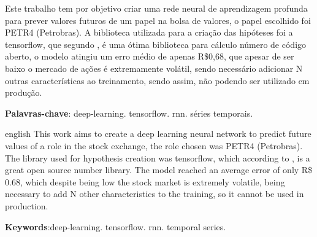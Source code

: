 \documentclass[
	article,			%
	11pt,				%
	oneside,			%
	a4paper,			%
	english,			%
	brazil,				%
	sumario=tradicional
	]{abntex2}
\begin{document}

\frenchspacing 


%
%

\maketitle





\begin{resumoumacoluna}
 Este trabalho tem por objetivo criar uma rede neural de aprendizagem profunda para prever valores futuros de um papel na bolsa de valores, o papel escolhido foi PETR4 (Petrobras). A biblioteca utilizada para a criação das hipóteses foi a tensorflow, que segundo , é uma ótima biblioteca para cálculo número de código aberto, o modelo atingiu um erro médio de apenas R\$0,68, que apesar de ser baixo o mercado de ações é extremamente volátil, sendo necessário adicionar N outras características ao treinamento, sendo assim, não podendo ser utilizado em produção.
 \vspace{\onelineskip}
 
 \noindent
 \textbf{Palavras-chave}: deep-learning. tensorflow. rnn. séries temporais.
\end{resumoumacoluna}


\renewcommand{\resumoname}{Abstract}
\begin{resumoumacoluna}
 \begin{otherlanguage*}{english}
This work aims to create a deep learning neural network to predict future values of a role in the stock exchange, the role chosen was PETR4 (Petrobras). The library used for hypothesis creation was tensorflow, which according to , is a great open source number library. The model reached an average error of only R\$ 0.68, which despite being low the stock market is extremely volatile, being necessary to add N other characteristics to the training, so it cannot be used in production.

   \vspace{\onelineskip}
 
   \noindent
   \textbf{Keywords}:deep-learning. tensorflow. rnn. temporal series.
 \end{otherlanguage*}  
\end{resumoumacoluna}
\end{document}
